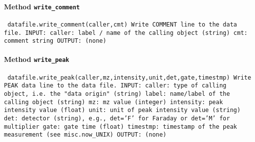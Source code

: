 \paragraph{Method \texttt{write_comment}}
\vspace{1ex}
\texttt{\newline
datafile.write_comment(caller,cmt)\newline
\newline
Write COMMENT line to the data file.\newline
\newline
INPUT:\newline
caller: label / name of the calling object (string)\newline
cmt: comment string\newline
\newline
OUTPUT:\newline
(none)\newline
\newline
}

\paragraph{Method \texttt{write_peak}}
\vspace{1ex}
\texttt{\newline
datafile.write_peak(caller,mz,intensity,unit,det,gate,timestmp)\newline
\newline
Write PEAK data line to the data file.\newline
\newline
INPUT:\newline
caller: type of calling object, i.e. the "data origin" (string)\newline
label: name/label of the calling object (string)\newline
mz: mz value (integer)\newline
intensity: peak intensity value (float)\newline
unit: unit of peak intensity value (string)\newline
det: detector (string), e.g., det='F' for Faraday or det='M' for multiplier\newline
gate: gate time (float)\newline
timestmp: timestamp of the peak measurement (see misc.now_UNIX)\newline
\newline
OUTPUT:\newline
(none)\newline
\newline
}

